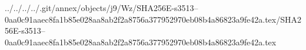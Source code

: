 ../../../../.git/annex/objects/j9/Wz/SHA256E-s3513--0aa0c91aaec8fa1b85e028aa8ab2f2a8756a377952970eb08b4a86823a9fe42a.tex/SHA256E-s3513--0aa0c91aaec8fa1b85e028aa8ab2f2a8756a377952970eb08b4a86823a9fe42a.tex